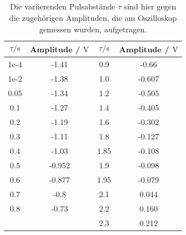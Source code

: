 \begin{table} \caption{Die variierenden Pulsabstände $\tau$ sind hier gegen die zugehörigen Amplituden, die am Oszilloskop gemessen wurden, aufgetragen.}
    \label{tab:t1}
    \centering
    \begin{tabular}{S[] S[] | S[] S[]}
        \toprule
        {$\tau / \si{\second}$} & {Amplitude / $\si{\volt}$} & {$\tau / \si{\second}$} & {Amplitude / $\si{\volt}$} \\
        \midrule
        1e-4&  -1.41    &        0.9  &  -0.66    \\
        1e-2&  -1.38    &        1.0  &  -0.607   \\
        0.05&  -1.34    &        1.2  &  -0.505   \\
        0.1 &  -1.27    &        1.4  &  -0.405   \\
        0.2 &  -1.19    &        1.6  &  -0.302   \\
        0.3 &  -1.11    &        1.8  &  -0.127   \\
        0.4 &  -1.03    &        1.85 &  -0.108   \\
        0.5 &  -0.952   &        1.9  &  -0.098   \\
        0.6 &  -0.877   &        1.95 &  -0.079   \\
        0.7 &  -0.8     &        2.1  &   0.044   \\
        0.8 &  -0.73    &        2.2  &   0.160 \\
            &           &        2.3  &  0.212  \\
        \bottomrule
    \end{tabular}
\end{table}